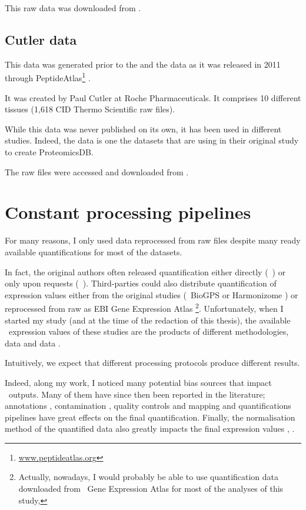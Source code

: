 This raw data was downloaded from .

\subsection{Cutler data}

This data was generated prior to the  and the 
data as it was released in 2011 through PeptideAtlas\footnote{%
\href{http://www.peptideatlas.org/}{www.peptideatlas.org}}
\citep{PeptideAtlas}.

It was created by Paul Cutler at Roche Pharmaceuticals.
It comprises 10 different tissues (1,618 \gls{CID} Thermo Scientific raw files).

While this data was never published on its own, it has been used in different
studies. Indeed, the  data is one the datasets that
\cite{KusterData} are using in their original study to create ProteomicsDB.

The raw files were accessed and downloaded from .

\section{Constant processing pipelines}

For many reasons, I only used data reprocessed from raw files despite many
ready available quantifications for most of the datasets.

In fact, the original authors often released
quantification either directly (\eg\ \cite{Krupp2012})
or only upon requests (\eg\ \cite{PandeyData}).
Third-parties could also distribute quantification of expression values either
from the original studies (\eg\ BioGPS \citep{BioGPS1} or
Harmonizome \citep{Harmonizome}) or
reprocessed from raw as EBI Gene Expression Atlas \citep{EBIgxa}\footnote{Actually,
nowadays, I would probably be able to use quantification data downloaded
from \EBI\ Gene Expression Atlas for most of the analyses of this study,}.
Unfortunately, when I started my study (and at the time of the redaction
of this thesis), the available \Rnaseq\ expression values of these studies
are the products of different methodologies, \eg\ \dataset{\Gtex}
data \citep{GTExTranscript} and  data \citep{Krupp2012}.

Intuitively, we expect that different processing protocols produce
different results.

Indeed, along my work, I noticed many potential bias sources that impact
\Rnaseq\ outputs. Many of them have since then been reported in the literature;
annotations \citep{annotationDiff},
contamination \citep{contaminationRNAseq},
quality controls \citep{qualityRNAseq} and
mapping and quantifications pipelines \citep{Fonseca2014}
have great effects on the final quantification. Finally, the normalisation
method of the quantified data also greatly impacts the final expression values
\citep{Dillies2013}, \citep{normalisation2}.

